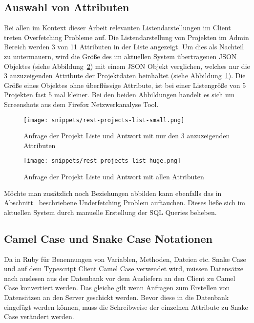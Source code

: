 \subsection{Auswahl von Attributen}
\label{sec:requirements:cons:attributes}
Bei allen im Kontext dieser Arbeit relevanten Listendarstellungen im Client treten Overfetching Probleme auf.
Die Listendarstellung von Projekten im Admin Bereich werden 3 von 11 Attributen in der Liste angezeigt. 
Um dies als Nachteil zu untermauern, wird die Größe des im aktuellen System übertragenen JSON Objektes (siehe Abbildung~\ref{req:rest-projects-list-huge}) mit einem JSON Objekt verglichen, welches nur die 3 anzuzeigenden Attribute der Projektdaten beinhaltet (siehe Abbildung~\ref{req:rest-projects-list-small}). Die Größe eines Objektes ohne überflüssige Attribute, ist bei einer Listengröße von 5 Projekten fast 5 mal kleiner.
Bei den beiden Abbildungen handelt es sich um Screenshots aus dem Firefox Netzwerkanalyse Tool.

\begin{figure}[h!]
	\centering
	\texttt{[image: snippets/rest-projects-list-small.png]}
	\caption{Anfrage der Projekt Liste und Antwort mit nur den 3 anzuzeigenden Attributen}
	\label{req:rest-projects-list-small}
\end{figure}

\begin{figure}[h!]
	\centering
	\texttt{[image: snippets/rest-projects-list-huge.png]}
	\caption{Anfrage der Projekt Liste und Antwort mit allen Attributen}
	\label{req:rest-projects-list-huge}
\end{figure}

Möchte man zusätzlich noch Beziehungen abbilden kann ebenfalls das in Abschnitt~ beschriebene Underfetching Problem auftauchen.
Dieses ließe sich im aktuellen System durch manuelle Erstellung der SQL Queries beheben.

\subsection{Camel Case und Snake Case Notationen}
Da in Ruby für Benennungen von Variablen, Methoden, Dateien etc. Snake Case und auf dem Typescript Client Camel Case verwendet wird, müssen Datensätze nach auslesen aus der Datenbank vor dem Ausliefern an den Client zu Camel Case konvertiert werden. Das gleiche gilt wenn Anfragen zum Erstellen von Datensätzen an den Server geschickt werden. Bevor diese in die Datenbank eingefügt werden können, muss die Schreibweise der einzelnen Attribute zu Snake Case verändert werden.

